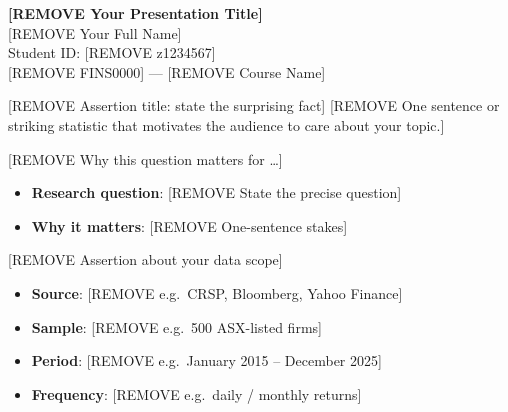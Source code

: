 \documentclass[aspectratio=169,11pt]{beamer}
\begin{document}
\begin{frame}[plain]
\vfill
\begin{center}
  {\Large\color{navy}\textbf{[REMOVE Your Presentation Title]}}\\[12pt]
  {\normalsize\color{darkgray}[REMOVE Your Full Name]\\
  Student ID: [REMOVE z1234567]\\[6pt]
  \color{steel}[REMOVE FINS0000] --- [REMOVE Course Name]\\
  [REMOVE Semester, Year]}
\end{center}
\vfill
\end{frame}

\begin{frame}{[REMOVE Assertion title: state the surprising fact]}
  \vfill
  \centering
  {\large [REMOVE One sentence or striking statistic that motivates
  the audience to care about your topic.]}
  \vfill
\end{frame}

\begin{frame}{[REMOVE Why this question matters for \ldots]}
  \begin{itemize}
    \item \textbf{Research question}: [REMOVE State the precise question]
    \item \textbf{Why it matters}: [REMOVE One-sentence stakes]
  \end{itemize}
\end{frame}

\begin{frame}{[REMOVE Assertion about your data scope]}
  \begin{itemize}
    \item \textbf{Source}: [REMOVE e.g.\ CRSP, Bloomberg, Yahoo Finance]
    \item \textbf{Sample}: [REMOVE e.g.\ 500 ASX-listed firms]
    \item \textbf{Period}: [REMOVE e.g.\ January 2015 -- December 2025]
    \item \textbf{Frequency}: [REMOVE e.g.\ daily / monthly returns]
  \end{itemize}
\end{frame}
\end{document}
